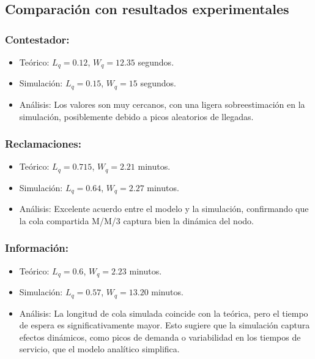 \documentclass[12pt]{article}
\begin{document}
\subsection{Comparación con resultados experimentales}

\subsubsection{Contestador:}
\begin{itemize}
    \item Teórico: $L_q = 0.12$, $W_q = 12.35$ segundos.
    \item Simulación: $L_q = 0.15$, $W_q = 15$ segundos.
    \item Análisis: Los valores son muy cercanos, con una ligera sobreestimación en la simulación, posiblemente debido a picos aleatorios de llegadas.
\end{itemize}

\subsubsection{Reclamaciones:}
\begin{itemize}
    \item Teórico: $L_q = 0.715$, $W_q = 2.21$ minutos.
    \item Simulación: $L_q = 0.64$, $W_q = 2.27$ minutos.
    \item Análisis: Excelente acuerdo entre el modelo y la simulación, confirmando que la cola compartida M/M/3 captura bien la dinámica del nodo.
\end{itemize}

\subsubsection{Información:}
\begin{itemize}
    \item Teórico: $L_q = 0.6$, $W_q = 2.23$ minutos.
    \item Simulación: $L_q = 0.57$, $W_q = 13.20$ minutos.
    \item Análisis: La longitud de cola simulada coincide con la teórica, pero el tiempo de espera es significativamente mayor. Esto sugiere que la simulación captura efectos dinámicos, como picos de demanda o variabilidad en los tiempos de servicio, que el modelo analítico simplifica.
\end{itemize}
\end{document}
